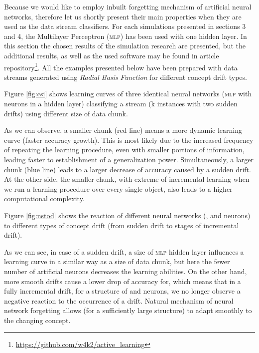 \noindent Because we would like to employ inbuilt forgetting mechanism of artificial neural networks, therefore let us shortly present their main properties when they are used as the data stream classifiers. For each simulations presented in sections 3 and 4, the Multilayer Perceptron (\textsc{mlp}) has been used with one hidden layer. In this section the chosen results of the simulation research are presented, but the additional results, as well as the used software may be found in article repository\footnote{\url{https://github.com/w4k2/active_learning}}. All the examples presented below have been prepared with data streams generated using \emph{Radial Basis Function} for different concept drift types.


Figure \ref{fig:csi} shows learning curves of three identical neural networks (\textsc{mlp} with  neurons in a hidden layer) classifying a stream (k instances with two sudden drifts) using different size of data chunk.



As we can observe, a smaller chunk (red line) means a more dynamic learning curve (faster accuracy growth). This is most likely due to the increased frequency of repeating the learning procedure, even with smaller portions of information, leading faster to establishment of a generalization power. Simultaneously, a larger chunk (blue line) leads to a larger decrease of accuracy caused by a sudden drift. At the other side, the smaller chunk, with extreme of incremental learning when we run a learning procedure over every single object, also leads to a higher computational complexity.

Figure \ref{fig:nstod} shows the reaction of different neural networks (,  and  neurons) to different types of concept drift (from sudden drift to stages of incremental drift).



As we can see, in case of a sudden drift, a size of \textsc{mlp} hidden layer influences a learning curve in a similar way as a size of data chunk, but here the fewer number of artificial neurons decreases the learning abilities. On the other hand, more smooth drifts cause a lower drop of accuracy for, which means that in a fully incremental drift, for a structure of  and  neurons, we no longer observe a negative reaction to the occurrence of a drift. Natural mechanism of neural network forgetting allows (for a sufficiently large structure) to adapt smoothly to the changing concept.


